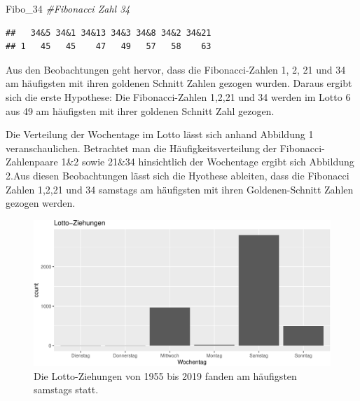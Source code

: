 \documentclass[ngerman,]{article}
\newenvironment{Shaded}{\begin{snugshade}}{\end{snugshade}}
\newcommand{\DecValTok}[1]{\textcolor[rgb]{0.00,0.00,0.81}{#1}}
\newcommand{\CommentTok}[1]{\textcolor[rgb]{0.56,0.35,0.01}{\textit{#1}}}
\newcommand{\NormalTok}[1]{#1}
\begin{document}
\begin{Shaded}
\begin{Highlighting}[]
\NormalTok{Fibo_}\DecValTok{34} \CommentTok{#Fibonacci Zahl 34}
\end{Highlighting}
\end{Shaded}

\begin{verbatim}
##   34&5 34&1 34&13 34&3 34&8 34&2 34&21
## 1   45   45    47   49   57   58    63
\end{verbatim}

Aus den Beobachtungen geht hervor, dass die Fibonacci-Zahlen 1, 2, 21
und 34 am häufigsten mit ihren goldenen Schnitt Zahlen gezogen wurden.
Daraus ergibt sich die erste Hypothese: Die Fibonacci-Zahlen 1,2,21 und
34 werden im Lotto 6 aus 49 am häufigsten mit ihrer goldenen Schnitt
Zahl gezogen.

Die Verteilung der Wochentage im Lotto lässt sich anhand Abbildung 1
veranschaulichen. Betrachtet man die Häufigkeitsverteilung der
Fibonacci-Zahlenpaare 1\&2 sowie 21\&34 hinsichtlich der Wochentage
ergibt sich Abbildung 2.Aus diesen Beobachtungen lässt sich die Hyothese
ableiten, dass die Fibonacci Zahlen 1,2,21 und 34 samstags am häufigsten
mit ihren Goldenen-Schnitt Zahlen gezogen werden.

\begin{figure}

\includegraphics{Abbildung/unnamed-chunk-2-1} \hfill{}

\caption{Die Lotto-Ziehungen von 1955 bis 2019 fanden am häufigsten samstags statt.}\label{fig:unnamed-chunk-2}
\end{figure}
\end{document}

